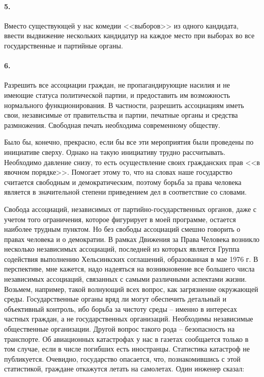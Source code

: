 \documentclass{book}
\begin{document}
\paragraph{5.} Вместо существующей у нас комедии <<выборов>> из одно­го кандидата, ввести выдвижение нескольких кандидатур на каждое место при выборах во все государственные и партий­ные органы.

\paragraph{6.} Разрешить все ассоциации граждан, не пропагандирующие насилия и не имеющие статуса политической партии, и предоста­вить им возможность нормального функционирования. В частно­сти, разрешить ассоциациям иметь свои, независимые от прави­тельства и партии, печатные органы и средства размножения. Свободная печать необходима современному обществу.

Было бы, конечно, прекрасно, если бы все эти мероприятия были проведены по инициативе сверху. Однако на такую инициа­тиву трудно рассчитывать. Необходимо давление снизу, то есть осуществление своих гражданских прав <<в явочном порядке>>. Помогает этому то, что на словах наше государство считается свободным и демократическим, поэтому борьба за права челове­ка является в значительной степени приведением дел в соответ­ствие со словами.

Свобода ассоциаций, независимых от партийно-государствен­ных органов, даже с учетом того ограничения, которое фигури­рует в моей программе, остается наиболее трудным пунктом. Но без свободы ассоциаций смешно говорить о правах человека и о демократии. В рамках Движения за Права Человека возникло несколько независимых ассоциаций, последней из которых яв­ляется Группа содействия выполнению Хельсинкских соглаше­ний, образованная в мае 1976 г. В перспективе, мне кажется, на­до надеяться на возникновение все большего числа независимых ассоциаций, связанных с самыми различными аспектами жизни. Возьмем, например, такой волнующий всех вопрос, как загряз­нение окружающей среды. Государственные органы вряд ли мо­гут обеспечить детальный и объективный контроль, ибо борьба за чистоту среды -- именно в интересах частных граждан, а не го­сударственных организаций. Необходимы независимые общест­венные организации. Другой вопрос такого рода -- безопасность на транспорте. Об авиационных катастрофах у нас в газетах сооб­щается 
только в том случае, если в числе погибших есть иност­ранцы. Статистика катастроф не публикуется. Очевидно, госу­дарство опасается, что, познакомившись с этой статистикой, граждане откажутся летать на самолетах. Один инженер сказал:
\end{document}
